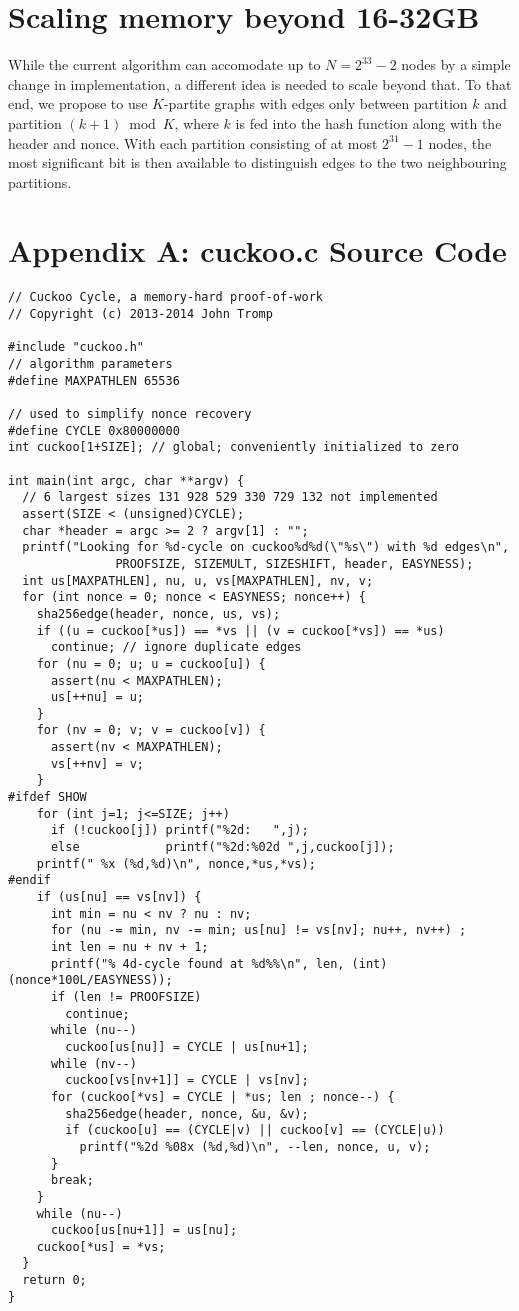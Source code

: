 \documentclass[11pt, oneside]{article}
\begin{document}
\section{Scaling memory beyond 16-32GB}
While the current algorithm can accomodate up to $N=2^{33}-2$ nodes by a simple change
in implementation, a different idea is needed to scale beyond that.
To that end, we propose to use $K$-partite graphs with edges only between partition $k$ and partition $(k+1) \bmod K$,
where $k$ is fed into the hash function along with the header and nonce. With each partition consisting of at most
$2^31-1$ nodes, the most significant bit is then available to distinguish edges to the two neighbouring partitions.




\section{Appendix A: cuckoo.c Source Code}
\footnotesize
\begin{verbatim}
// Cuckoo Cycle, a memory-hard proof-of-work
// Copyright (c) 2013-2014 John Tromp

#include "cuckoo.h"
// algorithm parameters
#define MAXPATHLEN 65536

// used to simplify nonce recovery
#define CYCLE 0x80000000
int cuckoo[1+SIZE]; // global; conveniently initialized to zero

int main(int argc, char **argv) {
  // 6 largest sizes 131 928 529 330 729 132 not implemented
  assert(SIZE < (unsigned)CYCLE);
  char *header = argc >= 2 ? argv[1] : "";
  printf("Looking for %d-cycle on cuckoo%d%d(\"%s\") with %d edges\n",
               PROOFSIZE, SIZEMULT, SIZESHIFT, header, EASYNESS);
  int us[MAXPATHLEN], nu, u, vs[MAXPATHLEN], nv, v; 
  for (int nonce = 0; nonce < EASYNESS; nonce++) {
    sha256edge(header, nonce, us, vs);
    if ((u = cuckoo[*us]) == *vs || (v = cuckoo[*vs]) == *us)
      continue; // ignore duplicate edges
    for (nu = 0; u; u = cuckoo[u]) {
      assert(nu < MAXPATHLEN);
      us[++nu] = u;
    }
    for (nv = 0; v; v = cuckoo[v]) {
      assert(nv < MAXPATHLEN);
      vs[++nv] = v;
    }
#ifdef SHOW
    for (int j=1; j<=SIZE; j++)
      if (!cuckoo[j]) printf("%2d:   ",j);
      else            printf("%2d:%02d ",j,cuckoo[j]);
    printf(" %x (%d,%d)\n", nonce,*us,*vs);
#endif
    if (us[nu] == vs[nv]) {
      int min = nu < nv ? nu : nv;
      for (nu -= min, nv -= min; us[nu] != vs[nv]; nu++, nv++) ;
      int len = nu + nv + 1;
      printf("% 4d-cycle found at %d%%\n", len, (int)(nonce*100L/EASYNESS));
      if (len != PROOFSIZE)
        continue;
      while (nu--)
        cuckoo[us[nu]] = CYCLE | us[nu+1];
      while (nv--)
        cuckoo[vs[nv+1]] = CYCLE | vs[nv];
      for (cuckoo[*vs] = CYCLE | *us; len ; nonce--) {
        sha256edge(header, nonce, &u, &v);
        if (cuckoo[u] == (CYCLE|v) || cuckoo[v] == (CYCLE|u))
          printf("%2d %08x (%d,%d)\n", --len, nonce, u, v);
      }
      break;
    }
    while (nu--)
      cuckoo[us[nu+1]] = us[nu];
    cuckoo[*us] = *vs;
  }
  return 0;
}
\end{verbatim}
\end{document}
